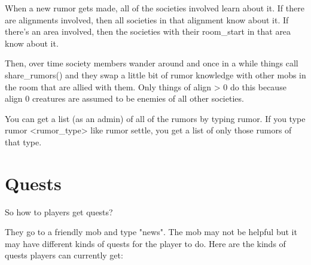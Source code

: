 When a new rumor gets made, all of the societies involved learn
about it. If there are alignments involved, then all societies in
that alignment know about it. If there's an area involved, then
the societies with their room\_start in that area know about it.

Then, over time society members wander around and once in a while
things call share\_rumors() and they swap a little bit of
rumor knowledge with other mobs in the room that are allied
with them. Only things of align > 0 do this because align 0
creatures are assumed to be enemies of all other societies.

You can get a list (as an admin) of all of the rumors by typing
rumor. If you type rumor <rumor_type> like rumor settle, you get
a list of only those rumors of that type.

\section{Quests}

So how to players get quests?

They go to a friendly mob and type "news". The mob may not be helpful
but it may have different kinds of quests for the player to do. 
Here are the kinds of quests players can currently get:

